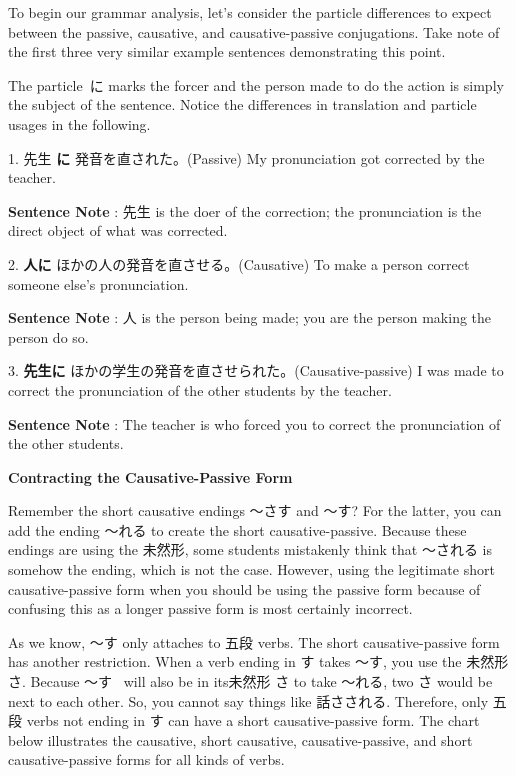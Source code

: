 \par{ To begin our grammar analysis, let's consider the particle differences to expect between the passive, causative, and causative-passive conjugations. Take note of the first three very similar example sentences demonstrating this point. }

\par{ The particle に marks the forcer and the person made to do the action is simply the subject of the sentence. Notice the differences in translation and particle usages in the following. }

\par{1. 先生 \textbf{に }発音を直された。(Passive) \hfill\break
My pronunciation got corrected by the teacher. }

\par{\textbf{Sentence Note }: 先生 is the doer of the correction; the pronunciation is the direct object of what was corrected. }

\par{2. \textbf{人に }ほかの人の発音を直させる。(Causative) \hfill\break
To make a person correct someone else's pronunciation. }

\par{\textbf{Sentence Note }: 人 is the person being made; you are the person making the person do so. }

\par{3. \textbf{先生に }ほかの学生の発音を直させられた。(Causative-passive) \hfill\break
I was made to correct the pronunciation of the other students by the teacher. }

\par{\textbf{Sentence Note }: The teacher is who forced you to correct the pronunciation of the other students. }

\par{ \textbf{Contracting the Causative-Passive Form }}

\par{Remember the short causative endings ～さす and ～す? For the latter, you can add the ending ～れる to create the short causative-passive. Because these endings are using the 未然形, some students mistakenly think that ～される is somehow the ending, which is not the case. However, using the legitimate short causative-passive form when you should be using the passive form because of confusing this as a longer passive form is most certainly incorrect. }

\par{ As we know, ～す only attaches to 五段 verbs. The short causative-passive form has another restriction. When a verb ending in す takes ～す, you use the 未然形 さ. Because ～す  will also be in its未然形 さ to take ～れる, two さ would be next to each other. So, you cannot say things like 話さされる. Therefore, only 五段 verbs not ending in す can have a short causative-passive form. The chart below illustrates the causative, short causative, causative-passive, and short causative-passive forms for all kinds of verbs. }

